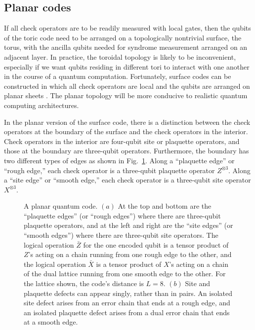 \subsection{Planar codes}

If all check operators are to be readily measured with local gates, then the qubits of the toric code need to be arranged on a topologically nontrivial surface, the torus, with the ancilla qubits needed for syndrome measurement arranged on an adjacent layer. In practice, the toroidal topology is likely to be inconvenient, especially if we want qubits residing in different tori to interact with one another in the course of a quantum computation. Fortunately, surface codes can be constructed in which all check operators are local and the qubits are arranged on planar sheets \cite{brav_kit,freed_meyer}. The planar topology will be more conducive to realistic quantum computing architectures.

In the planar version of the surface code, there is a distinction between the check operators at the boundary of the surface and the check operators in the interior.  Check operators in the interior are four-qubit site or plaquette operators, and those at the boundary are three-qubit operators.  Furthermore, the boundary has two different types of edges as shown in Fig.~\ref{fig_planar}. Along a ``plaquette edge''  or ``rough edge,'' each check operator is a three-qubit plaquette operator $Z^{\otimes 3}$. Along a ``site edge'' or ``smooth edge,'' each check operator is a three-qubit site operator $X^{\otimes 3}$. 

\begin{figure}
\begin{center}
\leavevmode
\epsfxsize=3in
\end{center}
\caption{A planar quantum code. $(a)$ At the top and bottom are the ``plaquette edges'' (or ``rough edges'') where there are three-qubit plaquette operators, and at the left and right are the ``site edges'' (or ``smooth edges'') where there are three-qubit site operators. The logical operation $\bar Z$ for the one encoded qubit is a tensor product of $Z$'s acting on a chain running from one rough edge to the other, and the logical operation $\bar X$ is a tensor product of $X$'s acting on a chain of the dual lattice running from one smooth edge to the other. For the lattice shown, the code's distance is $L=8$. $(b)$ Site and plaquette defects can appear singly, rather than in pairs. An isolated site defect arises from an error chain that ends at a rough edge, and an isolated plaquette defect arises from a dual error chain that ends at a smooth edge.} 
\label{fig_planar}
\end{figure}

